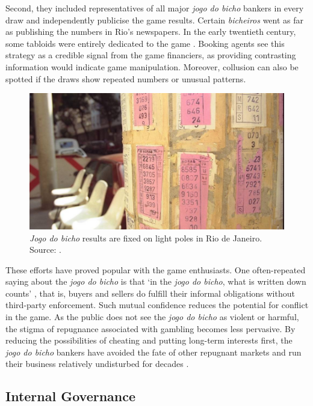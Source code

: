 Second, they included representatives of all major \emph{jogo do bicho} bankers in every draw and independently publicise the game results. Certain \emph{bicheiros} went as far as publishing the numbers in Rio's newspapers. In the early twentieth century, some tabloids were entirely dedicated to the game \citep[60]{magalhaes2005ganhou}. Booking agents see this strategy as a credible signal from the game financiers, as providing contrasting information would indicate game manipulation. Moreover, collusion can also be spotted if the draws show repeated numbers or unusual patterns.

\begin{figure}[!htbp]
	\centering
	\includegraphics[width=\textwidth, height=6cm]{images/bicho05.jpg}
	\caption{\emph{Jogo do bicho} results are fixed on light poles in Rio de Janeiro. Source: \citet{gomes1998bicho}.}
	\label{fig:poste}
\end{figure}

These efforts have proved popular with the game enthusiasts. One often-repeated saying about the \emph{jogo do bicho} is that `in the \emph{jogo do bicho}, what is written down counts' \citep[159]{chazkel2011laws}, that is, buyers and sellers do fulfill their informal obligations without third-party enforcement. Such mutual confidence reduces the potential for conflict in the game. As the public does not see the \emph{jogo do bicho} as violent or harmful, the stigma of repugnance associated with gambling becomes less pervasive. By reducing the possibilities of cheating and putting long-term interests first, the \emph{jogo do bicho} bankers have avoided the fate of other repugnant markets and run their business relatively undisturbed for decades \citep[20]{da1999aguias}.

\subsection{Internal Governance}
\label{sub:internal}

